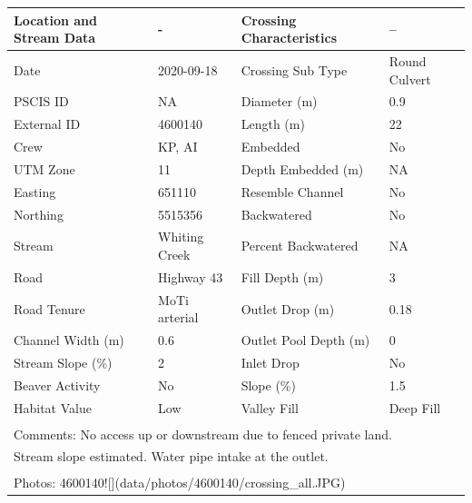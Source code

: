 \documentclass[
]{book}
\begin{document}
\begin{tabular}{l|l|l|l}
\hline
Location and Stream Data & - & Crossing Characteristics & --\\
\hline
Date & 2020-09-18 & Crossing Sub Type & Round Culvert\\
\hline
PSCIS ID & NA & Diameter (m) & 0.9\\
\hline
External ID & 4600140 & Length (m) & 22\\
\hline
Crew & KP, AI & Embedded & No\\
\hline
UTM Zone & 11 & Depth Embedded (m) & NA\\
\hline
Easting & 651110 & Resemble Channel & No\\
\hline
Northing & 5515356 & Backwatered & No\\
\hline
Stream & Whiting Creek & Percent Backwatered & NA\\
\hline
Road & Highway 43 & Fill Depth (m) & 3\\
\hline
Road Tenure & MoTi arterial & Outlet Drop (m) & 0.18\\
\hline
Channel Width (m) & 0.6 & Outlet Pool Depth (m) & 0\\
\hline
Stream Slope (\%) & 2 & Inlet Drop & No\\
\hline
Beaver Activity & No & Slope (\%) & 1.5\\
\hline
Habitat Value & Low & Valley Fill & Deep Fill\\
\hline
\multicolumn{4}{l}{\textsuperscript{} Comments: No access up or downstream due to fenced private land.}\\
\multicolumn{4}{l}{Stream slope estimated. Water pipe intake at the outlet.}\\
\multicolumn{4}{l}{\textsuperscript{} Photos: 4600140![](data/photos/4600140/crossing\_all.JPG)}\\
\end{tabular}
\end{document}
